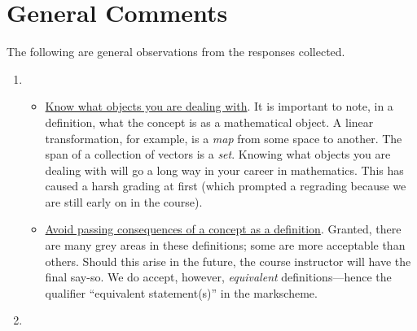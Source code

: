 \documentclass[answers,11pt]{exam}
\theoremstyle{definition}
\theoremstyle{definition}
\DeclareMathOperator{\1}{\mathbbm{1}}
\begin{document}
\clearpage


\section*{General Comments}
The following are general observations from the responses collected.


\begin{enumerate}
	\item \begin{itemize}
		
		\item \uline{Know what objects you are dealing with}. It is important to note, in a definition, what the concept is as a mathematical object. A linear transformation, for example, is a \textit{map} from some space to another. The span of a collection of vectors is a \textit{set}. Knowing what objects you are dealing with will go a long way in your career in mathematics. This has caused a harsh grading at first (which prompted a regrading because we are still early on in the course).
		
		\item \uline{Avoid passing consequences of a concept as a definition}. Granted, there are many grey areas in these definitions; some are more acceptable than others. Should this arise in the future, the course instructor will have the final say-so. We do accept, however, \textit{equivalent} definitions---hence the qualifier ``equivalent statement(s)'' in the markscheme.
	\end{itemize}
	
	
	\item 
\end{enumerate}
\end{document}
